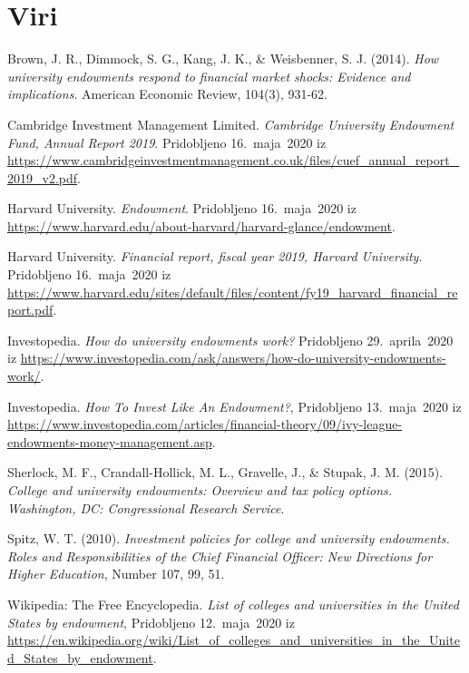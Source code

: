 \documentclass[12pt, a4paper]{article}
\begin{document}
\section[Viri]{Viri}
\begin{thebibliography}{99}

Brown, J. R., Dimmock, S. G., Kang, J. K., \& Weisbenner, S. J. (2014). \textit{How university endowments respond to financial market shocks: Evidence and implications}. American Economic Review, 104(3), 931-62.

Cambridge Investment Management Limited. \emph{Cambridge University Endowment Fund, Annual Report 2019}. Pridobljeno 16.~maja~2020 iz \url{https://www.cambridgeinvestmentmanagement.co.uk/files/cuef_annual_report_2019_v2.pdf}.

Harvard University. \emph{Endowment}. Pridobljeno 16.~maja~2020 iz \url{https://www.harvard.edu/about-harvard/harvard-glance/endowment}.

Harvard University. \emph{Financial report, fiscal year 2019, Harvard University}. Pridobljeno 16.~maja~2020 iz \url{https://www.harvard.edu/sites/default/files/content/fy19_harvard_financial_report.pdf}.

Investopedia. \emph{How do university endowments work?} Pridobljeno 29.~aprila~2020 iz \url{https://www.investopedia.com/ask/answers/how-do-university-endowments-work/}.

Investopedia. \emph{How To Invest Like An Endowment?}, Pridobljeno 13.~maja~2020 iz \url{https://www.investopedia.com/articles/financial-theory/09/ivy-league-endowments-money-management.asp}.

Sherlock, M. F., Crandall-Hollick, M. L., Gravelle, J., \& Stupak, J. M. (2015). \textit{College and university endowments: Overview and tax policy options. Washington, DC: Congressional Research Service}.

Spitz, W. T. (2010). \emph{Investment policies for college and university endowments. Roles and Responsibilities of the Chief Financial Officer: New Directions for Higher Education}, Number 107, 99, 51.

Wikipedia: The Free Encyclopedia. \emph{List of colleges and universities in the United States by endowment},  Pridobljeno 12.~maja~2020 iz \url{https://en.wikipedia.org/wiki/List_of_colleges_and_universities_in_the_United_States_by_endowment}.

\end{thebibliography}
\end{document}
